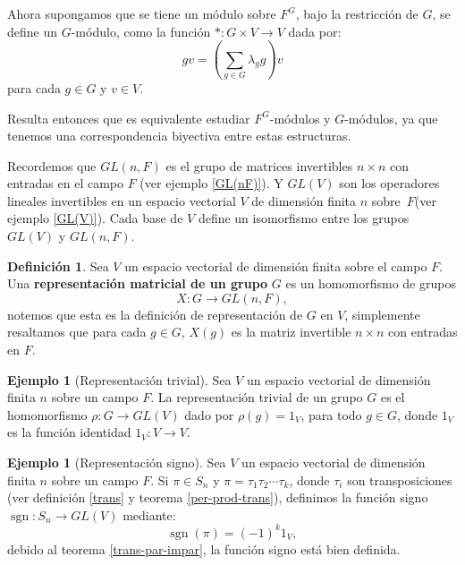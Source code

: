\documentclass[12pt]{book}
\theoremstyle{definition}
\newtheorem{definition}[theorem]{Definición}
\newtheorem{example}[theorem]{Ejemplo}
\DeclareMathOperator{\sgn}{sgn}
\newcounter{in}
\newcounter{ini}
\begin{document}
Ahora supongamos que se tiene un módulo sobre $F^{G}$, bajo la
restricción de $G$, se define un $G$-módulo, como la función
$*:G\times V\rightarrow V$ dada por:
\begin{equation*}
  gv=(\sum_{g\in G}\lambda_{g}g)v
\end{equation*}
para cada $g\in G$ y $v\in V$. %

Resulta entonces que es equivalente estudiar $F^{G}$-módulos y $G$-módulos, ya que tenemos una
correspondencia biyectiva entre estas estructuras.

Recordemos que $GL(n,F)$ es el grupo de matrices invertibles $n\times
n$ con entradas en el campo $F$ (ver ejemplo \ref{GL(nF)}). Y $GL(V)$ son los operadores lineales
invertibles en un espacio vectorial $V$ de dimensión finita $n$
sobre~$F$(ver ejemplo \ref{GL(V)}). 
Cada base de $V$ define un isomorfismo entre los grupos
$GL(V)$ y $GL(n,F)$.

\begin{definition}
  Sea $V$ un espacio vectorial de dimensión finita sobre el campo
  $F$. Una \textbf{representación matricial de un grupo} $G$ es un
  homomorfismo de grupos 
  $$X:G\rightarrow GL(n,F),$$
  notemos que esta es la definición de representación de $G$ en $V$, simplemente resaltamos que para cada $g\in G$, $X(g)$  es la
  matriz invertible $n \times n$ con entradas en $F$.
\end{definition}


\begin{example}[Representación trivial]
  Sea $V$ un espacio vectorial de dimensión finita $n$ sobre un campo $F$.
  La representación trivial de un grupo $G$ es el homomorfismo
  $\rho:G\rightarrow GL(V)$ dado por
  $\rho(g)=1_{V}$, para todo $g\in G$, donde $1_{V}$
  es la función identidad $1_{V}:V\rightarrow V$. 
\end{example}

\begin{example}[Representación signo]
  Sea $V$ un espacio vectorial de dimensión finita $n$ sobre un campo $F$.
  Si $\pi\in S_{n}$ y $\pi=\tau_{1}\tau_{2}\cdots\tau_{k}$, donde $\tau_{i}$ son
  transposiciones (ver definición \ref{trans} y teorema \ref{per-prod-trans}), definimos la función
  signo $\sgn:S_{n} \rightarrow GL(V)$
  mediante: $$\sgn(\pi)=(-1)^{k}1_{V},$$
  debido al teorema \ref{trans-par-impar}, la función signo está bien definida.
\end{example}
\end{document}
